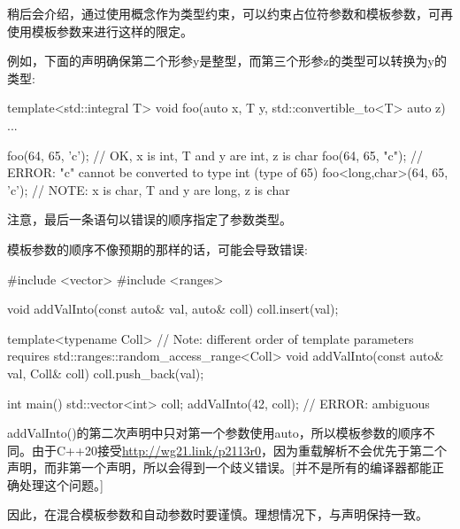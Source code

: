 稍后会介绍，通过使用概念作为类型约束，可以约束占位符参数和模板参数，可再使用模板参数来进行这样的限定。

例如，下面的声明确保第二个形参y是整型，而第三个形参z的类型可以转换为y的类型:

\begin{cpp}
template<std::integral T>
void foo(auto x, T y, std::convertible_to<T> auto z)
{
	...
}

foo(64, 65, 'c'); // OK, x is int, T and y are int, z is char
foo(64, 65, "c"); // ERROR: "c" cannot be converted to type int (type of 65)
foo<long,char>(64, 65, 'c'); // NOTE: x is char, T and y are long, z is char
\end{cpp}

注意，最后一条语句以错误的顺序指定了参数类型。

模板参数的顺序不像预期的那样的话，可能会导致错误:


\begin{cpp}
#include <vector>
#include <ranges>

void addValInto(const auto& val, auto& coll)
{
	coll.insert(val);
}

template<typename Coll> // Note: different order of template parameters
requires std::ranges::random_access_range<Coll>
void addValInto(const auto& val, Coll& coll)
{
	coll.push_back(val);
}

int main()
{
	std::vector<int> coll;
	addValInto(42, coll); // ERROR: ambiguous
}
\end{cpp}

addValInto()的第二次声明中只对第一个参数使用auto，所以模板参数的顺序不同。由于C++20接受\url{http://wg21.link/p2113r0}，因为重载解析不会优先于第二个声明，而非第一个声明，所以会得到一个歧义错误。[并不是所有的编译器都能正确处理这个问题。]

因此，在混合模板参数和自动参数时要谨慎。理想情况下，与声明保持一致。











